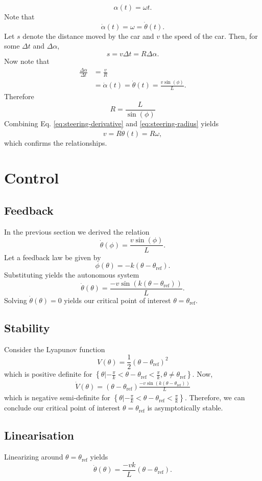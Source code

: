 \documentclass[11pt,titlepage]{report}
\begin{document}
\[
	\alpha(t) = \omega t.
\]
Note that
\[
	\dot{\alpha}(t) = \omega = \dot{\theta}(t).
\]
Let $s$ denote the distance moved by the car and $v$ the speed of the car. Then, for some $\Delta t$ and $\Delta \alpha$,
\[
	s = v \Delta t = R \Delta \alpha.
\]
Now note that
\begin{align*}
	\frac{\Delta \alpha}{\Delta t} &= \frac{v}{R} \\
	&=\dot{\alpha}(t)=\dot{\theta}(t) = \frac{v \sin{(\phi)}}{L}.
\end{align*}
Therefore
\begin{equation} \label{eq:steering-radius}
	R = \frac{L}{\sin{(\phi)}}
\end{equation}
Combining Eq. \ref{eq:steering-derivative} and \ref{eq:steering-radius} yields
\[
	v=R \dot{\theta}(t)=R \omega,
\]
which confirms the relationships.

\section*{Control}
\subsection*{Feedback}
In the previous section we derived the relation
\[
	\dot{\theta}(\phi) = \frac{v \sin{(\phi)}}{L}.
\]
Let a feedback law be given by
\[
	\phi(\theta) = -k(\theta-\theta_{\text{ref}}).
\]
Substituting yields the autonomous system
\[
	\dot{\theta}(\theta) = \frac{- v \sin{(k (\theta-\theta_{\text{ref}}))}}{L}.
\]
Solving $\dot{\theta}(\theta)=0$ yields our critical point of interest $\theta=\theta_{\text{ref}}$.

\subsection*{Stability}
Consider the Lyapunov function
\[
	V(\theta) = \frac{1}{2}(\theta-\theta_{\text{ref}})^2
\]
which is positive definite for $\left\{\theta | -\frac{\pi}{k} < \theta-\theta_{\text{ref}} < \frac{\pi}{k}, \theta \neq \theta_{\text{ref}} \right\}$. Now,
\begin{align*}
	\dot{V}(\theta) = (\theta-\theta_{\text{ref}}) \frac{- v \sin{(k ({\theta-\theta_{\text{ref}}}))}}{L}
\end{align*}
which is negative semi-definite for $\left\{\theta | -\frac{\pi}{k} < \theta-\theta_{\text{ref}} < \frac{\pi}{k}\right\}$. Therefore, we can conclude our critical point of interest $\theta=\theta_{\text{ref}}$ is asymptotically stable.

\subsection*{Linearisation}
Linearizing around $\theta=\theta_{\text{ref}}$ yields
\[
	\dot{\theta}(\theta) = \frac{- v k}{L} (\theta-\theta_{\text{ref}}).
\]
\end{document}
